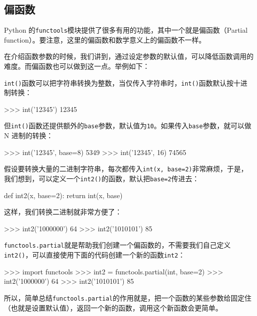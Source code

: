 \hypertarget{ux504fux51fdux6570}{%
\subsection{偏函数}\label{ux504fux51fdux6570}}

Python
的\texttt{functools}模块提供了很多有用的功能，其中一个就是偏函数（Partial
function）。要注意，这里的偏函数和数学意义上的偏函数不一样。

在介绍函数参数的时候，我们讲到，通过设定参数的默认值，可以降低函数调用的难度。而偏函数也可以做到这一点。举例如下：

\texttt{int()}函数可以把字符串转换为整数，当仅传入字符串时，\texttt{int()}函数默认按十进制转换：

\begin{pythoncode}
>>> int('12345')
12345
\end{pythoncode}

但\texttt{int()}函数还提供额外的\texttt{base}参数，默认值为\texttt{10}。如果传入\texttt{base}参数，就可以做
N 进制的转换：

\begin{pythoncode}
>>> int('12345', base=8)
5349
>>> int('12345', 16)
74565
\end{pythoncode}

假设要转换大量的二进制字符串，每次都传入\texttt{int(x,\ base=2)}非常麻烦，于是，我们想到，可以定义一个\texttt{int2()}的函数，默认把\texttt{base=2}传进去：

\begin{pythoncode}
def int2(x, base=2):
    return int(x, base)
\end{pythoncode}

这样，我们转换二进制就非常方便了：

\begin{pythoncode}
>>> int2('1000000')
64
>>> int2('1010101')
85
\end{pythoncode}

\texttt{functools.partial}就是帮助我们创建一个偏函数的，不需要我们自己定义\texttt{int2()}，可以直接使用下面的代码创建一个新的函数\texttt{int2}：

\begin{pythoncode}
>>> import functools
>>> int2 = functools.partial(int, base=2)
>>> int2('1000000')
64
>>> int2('1010101')
85
\end{pythoncode}

所以，简单总结\texttt{functools.partial}的作用就是，把一个函数的某些参数给固定住（也就是设置默认值），返回一个新的函数，调用这个新函数会更简单。

